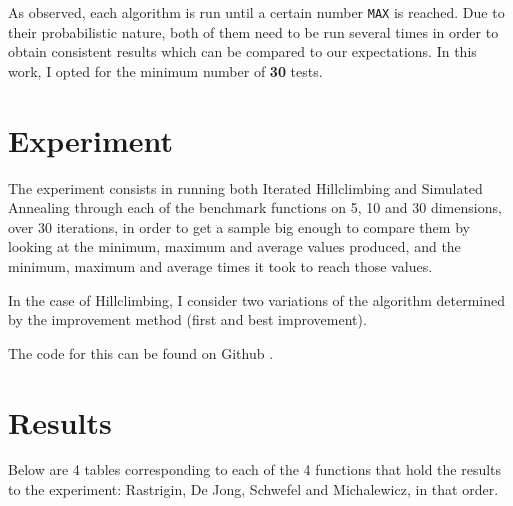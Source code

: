 \documentclass{article}
\begin{document}
\vspace{5mm}
As observed, each algorithm is run until a certain number \texttt{MAX} is reached.
Due to their probabilistic nature, both of them need to be run several times in order to obtain consistent results which can be compared to our expectations.
In this work, I opted for the minimum number of \textbf{30} tests.

\newpage

\section{Experiment}
The experiment consists in running both Iterated Hillclimbing and Simulated Annealing through each of the benchmark functions on 5, 10 and 30 dimensions, over 30 iterations, in order to get a sample big enough 
to compare them by looking at the minimum, maximum and average values produced, and the minimum, maximum and average times it took to reach those values. 

In the case of Hillclimbing, I consider two variations of the algorithm determined by the improvement method (first and best improvement).

The code for this can be found on Github \cite{github}.
\section{Results}
Below are 4 tables corresponding to each of the 4 functions that hold the results to the experiment: Rastrigin, De Jong, Schwefel and Michalewicz, in that order.

\vspace{5mm}
\end{document}
